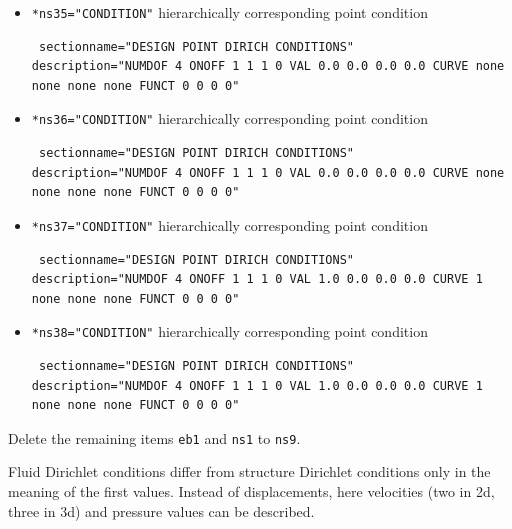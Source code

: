 \begin{itemize}
 \item \verb|*ns35="CONDITION"| \qquad hierarchically corresponding point condition
\begin{small} \begin{verbatim} sectionname="DESIGN POINT DIRICH CONDITIONS"
description="NUMDOF 4 ONOFF 1 1 1 0 VAL 0.0 0.0 0.0 0.0 CURVE none none none none FUNCT 0 0 0 0"
\end{verbatim} \end{small}

 \item \verb|*ns36="CONDITION"| \qquad hierarchically corresponding point condition
\begin{small} \begin{verbatim} sectionname="DESIGN POINT DIRICH CONDITIONS"
description="NUMDOF 4 ONOFF 1 1 1 0 VAL 0.0 0.0 0.0 0.0 CURVE none none none none FUNCT 0 0 0 0"
\end{verbatim} \end{small}

 \item \verb|*ns37="CONDITION"| \qquad hierarchically corresponding point condition
\begin{small} \begin{verbatim} sectionname="DESIGN POINT DIRICH CONDITIONS"
description="NUMDOF 4 ONOFF 1 1 1 0 VAL 1.0 0.0 0.0 0.0 CURVE 1 none none none FUNCT 0 0 0 0"
\end{verbatim} \end{small} 

\item \verb|*ns38="CONDITION"| \qquad hierarchically corresponding point condition
\begin{small} \begin{verbatim} sectionname="DESIGN POINT DIRICH CONDITIONS"
description="NUMDOF 4 ONOFF 1 1 1 0 VAL 1.0 0.0 0.0 0.0 CURVE 1 none none none FUNCT 0 0 0 0"
\end{verbatim} \end{small}

\end{itemize}

Delete the remaining items \verb|eb1| and \verb|ns1| to \verb|ns9|. \newline

Fluid Dirichlet conditions differ from structure Dirichlet conditions only in the meaning of the first values. Instead of displacements, here velocities (two in 2d, three in 3d) and pressure values can be described. 

